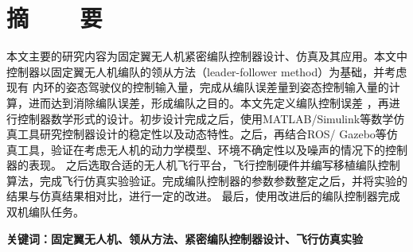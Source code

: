 \topskip=0pt

\vspace*{-7mm}

\begin{center}
  \heiti{}\textbf{\thesisTitle}
\end{center}

\vspace*{2mm}

{\let\clearpage\relax \chapter*{\textmd{摘~~~~要}}}
\setcounter{page}{1}

\vspace*{1mm}

\setlength{\parskip}{0em}

本文主要的研究内容为固定翼无人机紧密编队控制器设计、仿真及其应用。本文中控制器以固定翼无人机编队的领从方法（leader-follower 
method）为基础，并考虑现有
内环的姿态驾驶仪的控制输入量，完成从编队误差量到姿态控制输入量的计算，进而达到消除编队误差，形成编队之目的。本文先定义编队控制误差
，再进行控制器数学形式的设计。初步设计完成之后，使用MATLAB/Simulink等数学仿真工具研究控制器设计的稳定性以及动态特性。之后，再结合ROS/
Gazebo等仿真工具，验证在考虑无人机的动力学模型、环境不确定性以及噪声的情况下的控制器的表现。
之后选取合适的无人机飞行平台，飞行控制硬件并编写移植编队控制算法，完成飞行仿真实验验证。完成编队控制器的参数参数整定之后，并将实验的结果与仿真结果相对比，进行一定的改进。
最后，使用改进后的编队控制器完成双机编队任务。

\vspace{4ex}\noindent\textbf{\heiti 关键词：固定翼无人机、领从方法、紧密编队控制器设计、飞行仿真实验}
\newpage

\topskip=0pt

\vspace*{2mm}

\begin{spacing}{0.95}
  \centering
  \heiti{}\textbf{\thesisTitleEN}
\end{spacing}

